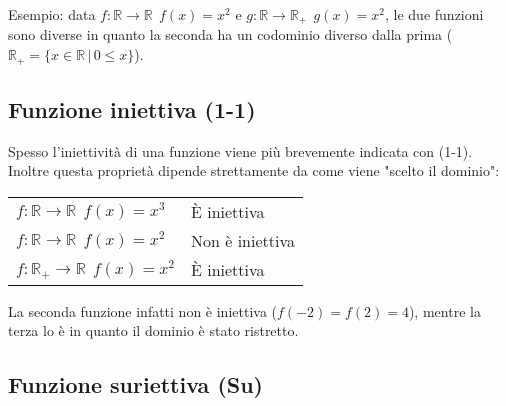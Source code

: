 Esempio: data $f: \mathbb{R} \to \mathbb{R}\;\, f(x) = x^2$ e $g: \mathbb{R} 
\to \mathbb{R}_{+}\;\, g(x) = x^2$, le due funzioni sono diverse in quanto la 
seconda ha un codominio diverso dalla prima ($\mathbb{R}_{+} = \{x \in 
\mathbb{R}\, |\, 0 \leq x\}$).\\


\subsection{Funzione iniettiva (1-1)}


Spesso l'iniettività di una funzione viene più brevemente indicata con (1-1). 
Inoltre questa proprietà dipende strettamente da come viene "scelto il 
dominio":

\begin{table}[H]
\centering
\begin{tabular}{ll}
$f: \mathbb{R} \to \mathbb{R}\;\, f(x) = x^3$          & È iniettiva      \\
$f: \mathbb{R} \to \mathbb{R}\;\, f(x) = x^2$        & Non è iniettiva  \\
$f: \mathbb{R}_{+} \to \mathbb{R}\;\, f(x) = x^2$ & È iniettiva     
\end{tabular}
\end{table}

La seconda funzione infatti non è iniettiva ($f(-2) = f(2) = 4$), mentre la 
terza lo è in quanto il dominio è stato ristretto.

\subsection{Funzione suriettiva (Su)}


